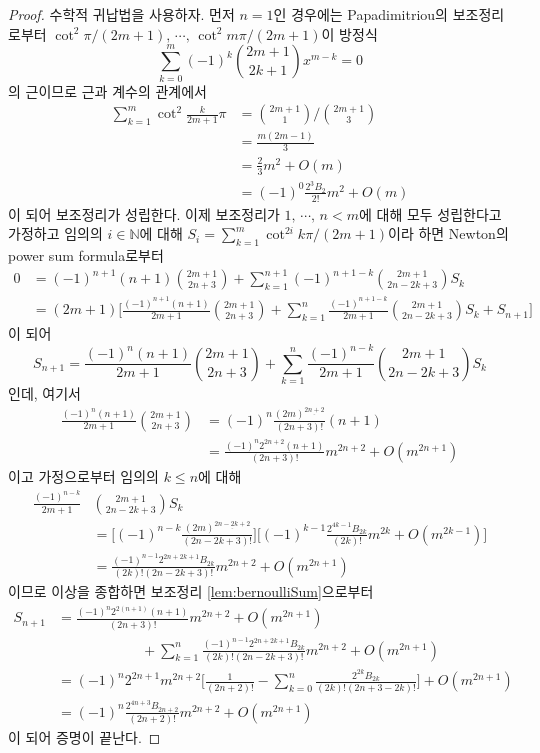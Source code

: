 \begin{proof}
    수학적 귀납법을 사용하자. 먼저 $n=1$인 경우에는 Papadimitriou의 보조정리로부터 $\cot^2\pi/(2m+1),\,\cdots,\,\cot^2m\pi/(2m+1)$이 방정식
    \begin{equation*}
        \sum_{k=0}^m(-1)^k\binom{2m+1}{2k+1}x^{m-k}=0
    \end{equation*}
    의 근이므로 근과 계수의 관계에서
    \begin{align*}
        \sum_{k=1}^m\cot^2\frac{k}{2m+1}\pi&=\binom{2m+1}{1}\bigg/\binom{2m+1}{3}\\
        &=\frac{m(2m-1)}{3}\\
        &=\frac{2}{3}m^2+O(m)\\
        &=(-1)^0\frac{2^3B_2}{2!}m^2+O(m)
    \end{align*}
    이 되어 보조정리가 성립한다. 이제 보조정리가 $1,\,\cdots,\,n<m$에 대해 모두 성립한다고 가정하고 임의의 $i\in\mathbb{N}$에 대해 $S_i=\sum_{k=1}^m\cot^{2i}k\pi/(2m+1)$이라 하면 Newton의 power sum formula로부터
    \begin{align*}
        0&=(-1)^{n+1}(n+1)\binom{2m+1}{2n+3}+\sum_{k=1}^{n+1}(-1)^{n+1-k}\binom{2m+1}{2n-2k+3}S_k\\
        &=(2m+1)\bigg[\frac{(-1)^{n+1}(n+1)}{2m+1}\binom{2m+1}{2n+3}+\sum_{k=1}^n\frac{(-1)^{n+1-k}}{2m+1}\binom{2m+1}{2n-2k+3}S_k+S_{n+1}\bigg]
    \end{align*}
    이 되어
    \begin{equation*}
        S_{n+1}=\frac{(-1)^n(n+1)}{2m+1}\binom{2m+1}{2n+3}+\sum_{k=1}^n\frac{(-1)^{n-k}}{2m+1}\binom{2m+1}{2n-2k+3}S_k
    \end{equation*}
    인데, 여기서
    \begin{align*}
        \frac{(-1)^n(n+1)}{2m+1}\binom{2m+1}{2n+3}&=(-1)^n\frac{(2m)^{\underline{2n+2}}}{(2n+3)!}(n+1)\\
        &=\frac{(-1)^n2^{2n+2}(n+1)}{(2n+3)!}m^{2n+2}+O(m^{2n+1})
    \end{align*}
    이고 가정으로부터 임의의 $k\leq n$에 대해
    \begin{align*}
        \frac{(-1)^{n-k}}{2m+1}&\binom{2m+1}{2n-2k+3}S_k\\
        &=\bigg[(-1)^{n-k}\frac{(2m)^{\underline{2n-2k+2}}}{(2n-2k+3)!}\bigg]\bigg[(-1)^{k-1}\frac{2^{4k-1}B_{2k}}{(2k)!}m^{2k}+O(m^{2k-1})\bigg]\\
        &=\frac{(-1)^{n-1}2^{2n+2k+1}B_{2k}}{(2k)!(2n-2k+3)!}m^{2n+2}+O(m^{2n+1})
    \end{align*}
    이므로 이상을 종합하면 보조정리 \ref{lem:bernoulliSum}으로부터
    \begin{align*}
        S_{n+1}&=\frac{(-1)^n2^{2(n+1)}(n+1)}{(2n+3)!}m^{2n+2}+O(m^{2n+1})\\
        &\qquad\qquad\qquad+\sum_{k=1}^n\frac{(-1)^{n-1}2^{2n+2k+1}B_{2k}}{(2k)!(2n-2k+3)!}m^{2n+2}+O(m^{2n+1})\\
        &=(-1)^n2^{2n+1}m^{2n+2}\bigg[\frac{1}{(2n+2)!}-\sum_{k=0}^n\frac{2^{2k}B_{2k}}{(2k)!(2n+3-2k)!}\bigg]+O(m^{2n+1})\\
        &=(-1)^n\frac{2^{4n+3}B_{2n+2}}{(2n+2)!}m^{2n+2}+O(m^{2n+1})
    \end{align*}
    이 되어 증명이 끝난다.
\end{proof}

